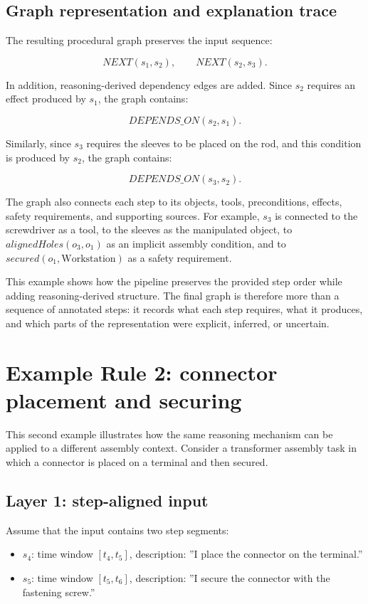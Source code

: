 \subsection{Graph representation and explanation trace}

The resulting procedural graph preserves the input sequence:

\[
NEXT(s_1,s_2), \qquad NEXT(s_2,s_3).
\]

In addition, reasoning-derived dependency edges are added. Since $s_2$ requires an effect produced by $s_1$, the graph contains:

\[
DEPENDS\_ON(s_2,s_1).
\]

Similarly, since $s_3$ requires the sleeves to be placed on the rod, and this condition is produced by $s_2$, the graph contains:

\[
DEPENDS\_ON(s_3,s_2).
\]

The graph also connects each step to its objects, tools, preconditions, effects, safety requirements, and supporting sources. For example, $s_3$ is connected to the screwdriver as a tool, to the sleeves as the manipulated object, to $alignedHoles(o_3,o_1)$ as an implicit assembly condition, and to $secured(o_1,\text{Workstation})$ as a safety requirement.

This example shows how the pipeline preserves the provided step order while adding reasoning-derived structure. The final graph is therefore more than a sequence of annotated steps: it records what each step requires, what it produces, and which parts of the representation were explicit, inferred, or uncertain.


\section{Example Rule 2: connector placement and securing}
\label{sec:example-rule2}

This second example illustrates how the same reasoning mechanism can be applied to a different assembly context. Consider a transformer assembly task in which a connector is placed on a terminal and then secured.

\subsection{Layer 1: step-aligned input}

Assume that the input contains two step segments:

\begin{itemize}
    \item $s_4$: time window $[t_4,t_5]$, description: ''I place the connector on the terminal.''
    \item $s_5$: time window $[t_5,t_6]$, description: ''I secure the connector with the fastening screw.''
\end{itemize}

